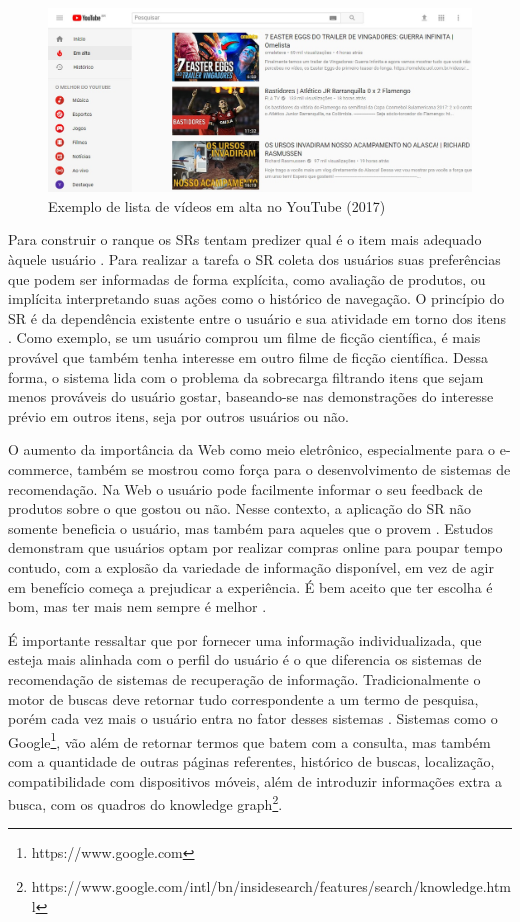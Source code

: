 \begin{figure}
	\centering
	\includegraphics[scale=0.50]{imagens/youtube.jpg}
	\caption{Exemplo de lista de vídeos em alta no YouTube (2017)}
	\label{fig:youtube_em_alta}
\end{figure} 

Para construir o ranque os SRs tentam predizer qual é o item mais adequado àquele usuário \citep{Ricci2011}. Para realizar a tarefa o SR coleta dos usuários suas preferências que podem ser informadas de forma explícita, como avaliação de produtos, ou implícita interpretando suas ações como o histórico de navegação. O princípio do SR é da dependência existente entre o usuário e sua atividade em torno dos itens \citep{Aggarwal:Intro:2016}. Como exemplo, se um usuário comprou um filme de ficção científica, é mais provável que também tenha interesse em outro filme de ficção científica. Dessa forma, o sistema lida com o problema da sobrecarga filtrando itens que sejam menos prováveis do usuário gostar, baseando-se nas demonstrações do interesse prévio em outros itens, seja por outros usuários ou não.

O aumento da importância da Web como meio eletrônico, especialmente para o e-commerce, também se mostrou como força para o desenvolvimento de sistemas de recomendação.  Na Web o usuário pode facilmente informar o seu feedback de produtos sobre o que gostou ou não. Nesse contexto, a aplicação do SR não somente beneficia o usuário, mas também para aqueles que o provem \citep{ ISINKAYE2015261}. Estudos \citep{Mykolas:2015a} demonstram que usuários optam por realizar compras online para poupar tempo contudo, com a explosão da variedade de informação disponível, em vez de agir em benefício começa a prejudicar a experiência. É bem aceito que ter escolha é bom, mas ter mais nem sempre é melhor \citep{Ricci2011}.

É importante ressaltar que por fornecer uma informação individualizada, que esteja mais alinhada com o perfil do usuário é o que diferencia os sistemas de recomendação de sistemas de recuperação de informação. Tradicionalmente o motor de buscas deve retornar tudo correspondente a um termo de pesquisa, porém cada vez mais o usuário entra no fator desses sistemas \citep{Burke:2002:HRS:586321.586352}. Sistemas como o Google\footnote{https://www.google.com}, vão além de retornar termos que batem com a consulta, mas também com a quantidade de outras páginas referentes, histórico de buscas, localização, compatibilidade com dispositivos móveis, além de introduzir informações extra a busca, com os quadros do knowledge graph\footnote{ https://www.google.com/intl/bn/insidesearch/features/search/knowledge.html}.

